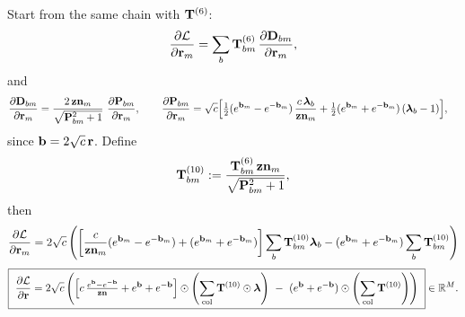 \documentclass{article}
\begin{document}
Start from the same chain with $\T{6}$:
\[
\ddfrac{\mathcal{L}}{\v{r}{m}}
= \sum_b \T{6}{bm}\,\ddfrac{\v{D}{bm}}{\v{r}{m}},
\]
and
\begin{align}
\ddfrac{\v{D}{bm}}{\v{r}{m}}
&= \frac{2\,\v{zn}{m}}{\sqrt{\v{P}{bm}^2+1}}\ \ddfrac{\v{P}{bm}}{\v{r}{m}},\qquad
\ddfrac{\v{P}{bm}}{\v{r}{m}}
= \sqrt{c}\Big[\tfrac12(\ev{b}{m}-\ev{-b}{m})\,\frac{c\,\lam_b}{\v{zn}{m}}
+ \tfrac12(\ev{b}{m}+\ev{-b}{m})\,(\lam_b-1)\Big],
\end{align}
since $\v{b}=2\sqrt{c}\,\v{r}$. Define
\[
\T{10}{bm}:=\frac{\T{6}{bm}\,\v{zn}{m}}{\sqrt{\v{P}{bm}^2+1}},
\]
then
\[
\ddfrac{\mathcal{L}}{\v{r}{m}}
= 2\sqrt{c}\left(
\left[\frac{c}{\v{zn}{m}}(\ev{b}{m}-\ev{-b}{m}) + (\ev{b}{m}+\ev{-b}{m})\right]\sum_b \T{10}{bm}\lam_b
- (\ev{b}{m}+\ev{-b}{m})\sum_b \T{10}{bm}
\right)
\]
\[
\boxed{\ \ddfrac{\mathcal{L}}{\v{r}} =
2\sqrt{c}\left(
\Big[c\,\tfrac{\ev{b}-\ev{-b}}{\v{zn}}+\ev{b}+\ev{-b}\Big]\odot \colnorm{\T{10}\odot\v{\lam}}
\ -\ (\ev{b}+\ev{-b})\odot \colnorm{\T{10}}
\right)\ }\in\mathbb{R}^{M}.
\]
\end{document}
